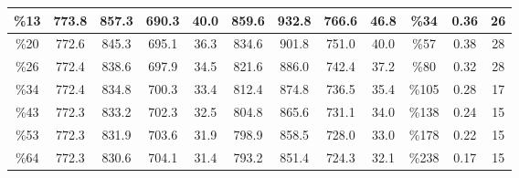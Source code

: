 \documentclass[12pt]{article}
\begin{document}
\begin{table}
{\begin{tabular}{|c|c|c|c|c|c|c|c|c|c|c|c|}
\%13                                                                                               & 773.8         & 857.3        & 690.3        & 40.0            & 859.6         & 932.8        & 766.6        & 46.8            & \%34                                    & 0.36    &26                                                                                              \\ \hline
\%20                                                                                               & 772.6         & 845.3        & 695.1        & 36.3            & 834.6         & 901.8        & 751.0        & 40.0            & \%57                                    & 0.38       &28                                                                                           \\ \hline
\%26                                                                                               & 772.4         & 838.6        & 697.9        & 34.5            & 821.6         & 886.0        & 742.4        & 37.2            & \%80                                    & 0.32          &28                                                                                        \\ \hline
\%34                                                                                               & 772.4         & 834.8        & 700.3        & 33.4            & 812.4         & 874.8        & 736.5        & 35.4            & \%105                                   & 0.28             &17                                                                                     \\ \hline
\%43                                                                                               & 772.3         & 833.2        & 702.3        & 32.5            & 804.8         & 865.6        & 731.1        & 34.0            & \%138                                   & 0.24                &15                                                                                  \\ \hline
\%53                                                                                               & 772.3         & 831.9        & 703.6        & 31.9            & 798.9         & 858.5        & 728.0        & 33.0            & \%178                                   & 0.22                   &15                                                                               \\ \hline
\%64                                                                                               & 772.3         & 830.6        & 704.1        & 31.4            & 793.2         & 851.4        & 724.3        & 32.1            & \%238                                   & 0.17                      &15                                                                            \\ \hline

\end{tabular}}
\end{table}
\end{document}
